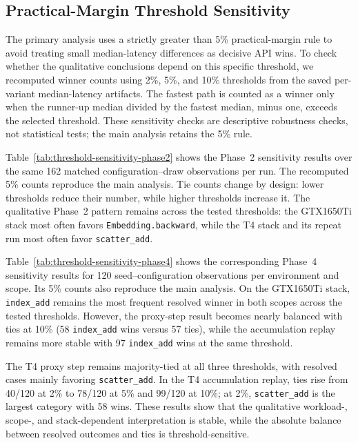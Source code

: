 

\subsection{Practical-Margin Threshold Sensitivity}
\label{sec:threshold-sensitivity}

The primary analysis uses a strictly greater than 5\% practical-margin rule to avoid treating small median-latency differences as decisive API wins. To check whether the qualitative conclusions depend on this specific threshold, we recomputed winner counts using 2\%, 5\%, and 10\% thresholds from the saved per-variant median-latency artifacts. The fastest path is counted as a winner only when the runner-up median divided by the fastest median, minus one, exceeds the selected threshold. These sensitivity checks are descriptive robustness checks, not statistical tests; the main analysis retains the 5\% rule.

Table~\ref{tab:threshold-sensitivity-phase2} shows the Phase~2 sensitivity results over the same 162 matched configuration--draw observations per run. The recomputed 5\% counts reproduce the main analysis. Tie counts change by design: lower thresholds reduce their number, while higher thresholds increase it. The qualitative Phase~2 pattern remains across the tested thresholds: the GTX1650Ti stack most often favors \texttt{Embedding.\allowbreak backward}, while the T4 stack and its repeat run most often favor \texttt{scatter\_\allowbreak add}.



Table~\ref{tab:threshold-sensitivity-phase4} shows the corresponding Phase~4 sensitivity results for 120 seed--configuration observations per environment and scope. Its 5\% counts also reproduce the main analysis. On the GTX1650Ti stack, \texttt{index\_\allowbreak add} remains the most frequent resolved winner in both scopes across the tested thresholds. However, the proxy-step result becomes nearly balanced with ties at 10\% (58 \texttt{index\_\allowbreak add} wins versus 57 ties), while the accumulation replay remains more stable with 97 \texttt{index\_\allowbreak add} wins at the same threshold.

The T4 proxy step remains majority-tied at all three thresholds, with resolved cases mainly favoring \texttt{scatter\_\allowbreak add}. In the T4 accumulation replay, ties rise from 40/120 at 2\% to 78/120 at 5\% and 99/120 at 10\%; at 2\%, \texttt{scatter\_\allowbreak add} is the largest category with 58 wins. These results show that the qualitative workload-, scope-, and stack-dependent interpretation is stable, while the absolute balance between resolved outcomes and ties is threshold-sensitive.

